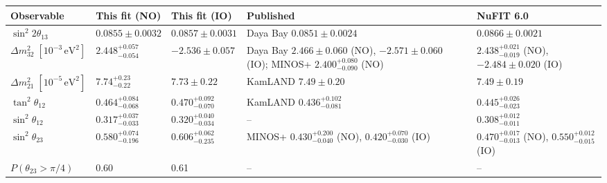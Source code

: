 \begin{tabular}{@{}lllll@{}}
  \toprule
  Observable & This fit (NO) & This fit (IO) & Published & NuFIT 6.0 \\
  \midrule
  \(\sin^2 2\theta_{13}\) & \(0.0855 \pm 0.0032\) & \(0.0857 \pm 0.0031\) & Daya Bay \(0.0851 \pm 0.0024\) & \(0.0866 \pm 0.0021\) \\
  \(\Delta m^2_{32}\;[10^{-3}\,\mathrm{eV}^2]\) & \(2.448^{+0.057}_{-0.054}\) & \(-2.536 \pm 0.057\) & Daya Bay \(2.466 \pm 0.060\) (NO), \(-2.571 \pm 0.060\) (IO); MINOS+ \(2.400^{+0.080}_{-0.090}\) (NO) & \(2.438^{+0.021}_{-0.019}\) (NO), \(-2.484 \pm 0.020\) (IO) \\
  \(\Delta m^2_{21}\;[10^{-5}\,\mathrm{eV}^2]\) & \(7.74^{+0.23}_{-0.22}\) & \(7.73 \pm 0.22\) & KamLAND \(7.49 \pm 0.20\) & \(7.49 \pm 0.19\) \\
  \(\tan^2\theta_{12}\) & \(0.464^{+0.084}_{-0.068}\) & \(0.470^{+0.092}_{-0.070}\) & KamLAND \(0.436^{+0.102}_{-0.081}\) & \(0.445^{+0.026}_{-0.023}\) \\
  \(\sin^2\theta_{12}\) & \(0.317^{+0.037}_{-0.033}\) & \(0.320^{+0.040}_{-0.034}\) & -- & \(0.308^{+0.012}_{-0.011}\) \\
  \(\sin^2\theta_{23}\) & \(0.580^{+0.074}_{-0.196}\) & \(0.606^{+0.062}_{-0.235}\) & MINOS+ \(0.430^{+0.200}_{-0.040}\) (NO), \(0.420^{+0.070}_{-0.030}\) (IO) & \(0.470^{+0.017}_{-0.013}\) (NO), \(0.550^{+0.012}_{-0.015}\) (IO) \\
  \(P(\theta_{23} > \pi/4)\) & 0.60 & 0.61 & -- & -- \\
  \bottomrule
\end{tabular}
